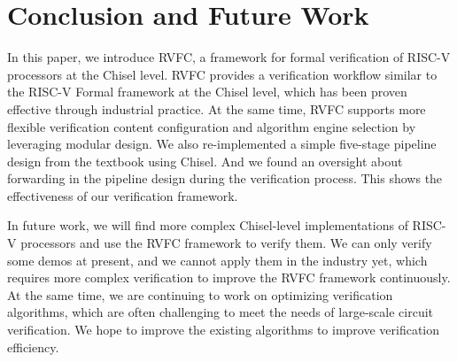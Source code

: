 \documentclass[conference]{IEEEtran}
\theoremstyle{definition}
\begin{document}
\section{Conclusion and Future Work}
In this paper, we introduce RVFC, a framework for formal verification of RISC-V processors at the Chisel level.
RVFC provides a verification workflow similar to the RISC-V Formal framework at the Chisel level, which has been proven effective through industrial practice.
At the same time, RVFC supports more flexible verification content configuration and algorithm engine selection by leveraging modular design.
We also re-implemented a simple five-stage pipeline design from the textbook using Chisel.
And we found an oversight about forwarding in the pipeline design during the verification process.
This shows the effectiveness of our verification framework.

In future work, we will find more complex Chisel-level implementations of RISC-V processors and use the RVFC framework to verify them.
We can only verify some demos at present, and we cannot apply them in the industry yet, which requires more complex verification to improve the RVFC framework continuously.
At the same time, we are continuing to work on optimizing verification algorithms, which are often challenging to meet the needs of large-scale circuit verification. We hope to improve the existing algorithms to improve verification efficiency.



\end{document}
